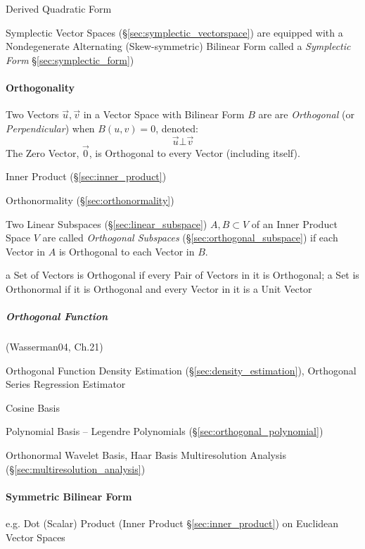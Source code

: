 Derived Quadratic Form

Symplectic Vector Spaces (\S\ref{sec:symplectic_vectorspace}) are equipped with
a Nondegenerate Alternating (Skew-symmetric) Bilinear Form called a
\emph{Symplectic Form} \S\ref{sec:symplectic_form})



\paragraph{Orthogonality}\label{sec:orthogonality}\hfill

Two Vectors $\vec{u}, \vec{v}$ in a Vector Space with Bilinear Form $B$ are are
\emph{Orthogonal} (or \emph{Perpendicular}) when $B(u,v) = 0$, denoted:
\[
  \vec{u} \bot \vec{v}
\]
The Zero Vector, $\vec{0}$, is Orthogonal to every Vector (including itself).

\fist Inner Product (\S\ref{sec:inner_product})

\fist Orthonormality (\S\ref{sec:orthonormality})

Two Linear Subspaces (\S\ref{sec:linear_subspace}) $A, B \subset V$ of an Inner
Product Space $V$ are called \emph{Orthogonal Subspaces}
(\S\ref{sec:orthogonal_subspace}) if each Vector in $A$ is Orthogonal to each
Vector in $B$.

a Set of Vectors is Orthogonal if every Pair of Vectors in it is Orthogonal; a
Set is Orthonormal if it is Orthogonal and every Vector in it is a Unit Vector



\subparagraph{Orthogonal Function}\label{sec:orthogonal_function}\hfill

(Wasserman04, Ch.21)

Orthogonal Function Density Estimation (\S\ref{sec:density_estimation}),
Orthogonal Series Regression Estimator

Cosine Basis

Polynomial Basis -- Legendre Polynomials (\S\ref{sec:orthogonal_polynomial})

Orthonormal Wavelet Basis, Haar Basis \fist Multiresolution Analysis
(\S\ref{sec:multiresolution_analysis})



\paragraph{Symmetric Bilinear Form}\label{sec:symmetric_bilinear}\hfill

e.g. Dot (Scalar) Product (Inner Product \S\ref{sec:inner_product}) on
Euclidean Vector Spaces


